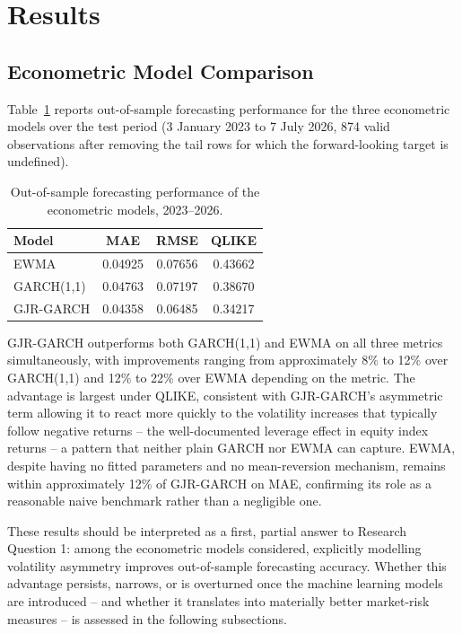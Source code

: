 \documentclass[12pt,a4paper]{article}
\begin{document}
\section{Results}
\subsection{Econometric Model Comparison}\label{sec:econ_comparison}
Table~\ref{tab:econ_comparison} reports out-of-sample forecasting performance for the three
econometric models over the test period (3 January 2023 to 7 July 2026, 874 valid observations
after removing the tail rows for which the forward-looking target is undefined).

\begin{table}[H]
\centering
\begin{tabular}{lccc}
\toprule
\textbf{Model} & \textbf{MAE} & \textbf{RMSE} & \textbf{QLIKE} \\
\midrule
EWMA        & 0.04925 & 0.07656 & 0.43662 \\
GARCH(1,1)  & 0.04763 & 0.07197 & 0.38670 \\
GJR-GARCH   & 0.04358 & 0.06485 & 0.34217 \\
\bottomrule
\end{tabular}
\caption{Out-of-sample forecasting performance of the econometric models, 2023--2026.}
\label{tab:econ_comparison}
\end{table}

GJR-GARCH outperforms both GARCH(1,1) and EWMA on all three metrics simultaneously, with
improvements ranging from approximately 8\% to 12\% over GARCH(1,1) and 12\% to 22\% over EWMA
depending on the metric. The advantage is largest under QLIKE, consistent with GJR-GARCH's
asymmetric term allowing it to react more quickly to the volatility increases that typically follow
negative returns -- the well-documented leverage effect in equity index returns -- a pattern that
neither plain GARCH nor EWMA can capture. EWMA, despite having no fitted parameters and no
mean-reversion mechanism, remains within approximately 12\% of GJR-GARCH on MAE, confirming its
role as a reasonable naive benchmark rather than a negligible one.

These results should be interpreted as a first, partial answer to Research Question 1: among the
econometric models considered, explicitly modelling volatility asymmetry improves out-of-sample
forecasting accuracy. Whether this advantage persists, narrows, or is overturned once the machine
learning models are introduced -- and whether it translates into materially better market-risk
measures -- is assessed in the following subsections.
\end{document}
